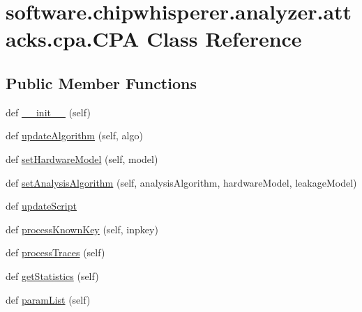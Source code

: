 \hypertarget{classsoftware_1_1chipwhisperer_1_1analyzer_1_1attacks_1_1cpa_1_1CPA}{}\section{software.\+chipwhisperer.\+analyzer.\+attacks.\+cpa.\+C\+P\+A Class Reference}
\label{classsoftware_1_1chipwhisperer_1_1analyzer_1_1attacks_1_1cpa_1_1CPA}
\subsection*{Public Member Functions}
\begin{DoxyCompactItemize}
\item 
def \hyperlink{classsoftware_1_1chipwhisperer_1_1analyzer_1_1attacks_1_1cpa_1_1CPA_ae83c4d5f16963fe1c3aedde9085e972e}{\+\_\+\+\_\+init\+\_\+\+\_\+} (self)
\item 
def \hyperlink{classsoftware_1_1chipwhisperer_1_1analyzer_1_1attacks_1_1cpa_1_1CPA_a16178f7a5d24e45eb6e05bdb9255fb25}{update\+Algorithm} (self, algo)
\item 
def \hyperlink{classsoftware_1_1chipwhisperer_1_1analyzer_1_1attacks_1_1cpa_1_1CPA_af7d63bd4b81488db84d145cc43d9966e}{set\+Hardware\+Model} (self, model)
\item 
def \hyperlink{classsoftware_1_1chipwhisperer_1_1analyzer_1_1attacks_1_1cpa_1_1CPA_a3f35e71a6b226c8c5b4ba08457df7a61}{set\+Analysis\+Algorithm} (self, analysis\+Algorithm, hardware\+Model, leakage\+Model)
\item 
def \hyperlink{classsoftware_1_1chipwhisperer_1_1analyzer_1_1attacks_1_1cpa_1_1CPA_aa77f970b093325f2f378888a28c3ae34}{update\+Script}
\item 
def \hyperlink{classsoftware_1_1chipwhisperer_1_1analyzer_1_1attacks_1_1cpa_1_1CPA_a51e4358698280731148d8cc6d070fb68}{process\+Known\+Key} (self, inpkey)
\item 
def \hyperlink{classsoftware_1_1chipwhisperer_1_1analyzer_1_1attacks_1_1cpa_1_1CPA_a48e1840a5c47d746180f82906b4e7c59}{process\+Traces} (self)
\item 
def \hyperlink{classsoftware_1_1chipwhisperer_1_1analyzer_1_1attacks_1_1cpa_1_1CPA_ae7db6d51ca83870782dcbc24fbc0e838}{get\+Statistics} (self)
\item 
def \hyperlink{classsoftware_1_1chipwhisperer_1_1analyzer_1_1attacks_1_1cpa_1_1CPA_a0726926974b21ec09d91075ecc5291c7}{param\+List} (self)
\end{DoxyCompactItemize}
